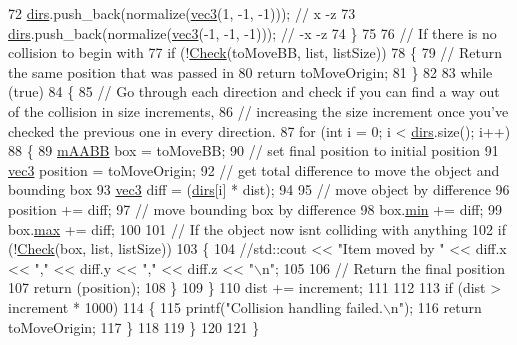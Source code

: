 \begin{DoxyCode}
72         \hyperlink{_island_collision_8cpp_aaaaa7b4cf9092c0cbadd963f4a7bc551}{dirs}.push\_back(normalize(\hyperlink{_types_8h_a3d0ce73e3199de81565fb01632415288}{vec3}(1, -1, -1))); \textcolor{comment}{// x -z}
73         \hyperlink{_island_collision_8cpp_aaaaa7b4cf9092c0cbadd963f4a7bc551}{dirs}.push\_back(normalize(\hyperlink{_types_8h_a3d0ce73e3199de81565fb01632415288}{vec3}(-1, -1, -1))); \textcolor{comment}{// -x -z}
74     \}
75 
76     \textcolor{comment}{// If there is no collision to begin with}
77     \textcolor{keywordflow}{if} (!\hyperlink{class_island_collision_a78e4fc740b5676ec2470fb3bd06e7fb7}{Check}(toMoveBB, list, listSize))
78     \{
79         \textcolor{comment}{// Return the same position that was passed in}
80         \textcolor{keywordflow}{return} toMoveOrigin;
81     \}
82 
83     \textcolor{keywordflow}{while} (\textcolor{keyword}{true})
84     \{
85         \textcolor{comment}{// Go through each direction and check if you can find a way out of the collision in size
       increments, }
86         \textcolor{comment}{// increasing the size increment once you've checked the previous one in every direction.}
87         \textcolor{keywordflow}{for} (\textcolor{keywordtype}{int} i = 0; i < \hyperlink{_island_collision_8cpp_aaaaa7b4cf9092c0cbadd963f4a7bc551}{dirs}.size(); i++)
88         \{
89             \hyperlink{structm_a_a_b_b}{mAABB} box = toMoveBB;
90             \textcolor{comment}{// set final position to initial position}
91             \hyperlink{_types_8h_a3d0ce73e3199de81565fb01632415288}{vec3} position = toMoveOrigin;
92             \textcolor{comment}{// get total difference to move the object and bounding box}
93             \hyperlink{_types_8h_a3d0ce73e3199de81565fb01632415288}{vec3} diff = (\hyperlink{_island_collision_8cpp_aaaaa7b4cf9092c0cbadd963f4a7bc551}{dirs}[i] * dist); 
94 
95             \textcolor{comment}{// move object by difference                                      }
96             position += diff;
97             \textcolor{comment}{// move bounding box by difference}
98             box.\hyperlink{structm_a_a_b_b_af759d65b18f76e266945883107dcafc8}{min} += diff; 
99             box.\hyperlink{structm_a_a_b_b_a9866d0a5a3ceb5dbff2bf87372f3094a}{max} += diff;
100 
101             \textcolor{comment}{// If the object now isnt colliding with anything}
102             \textcolor{keywordflow}{if} (!\hyperlink{class_island_collision_a78e4fc740b5676ec2470fb3bd06e7fb7}{Check}(box, list, listSize))
103             \{
104                 \textcolor{comment}{//std::cout << "Item moved by " << diff.x << "," << diff.y << "," << diff.z << "\(\backslash\)n";}
105 
106                 \textcolor{comment}{// Return the final position}
107                 \textcolor{keywordflow}{return} (position);
108             \}
109         \}
110         dist += increment;
111 
112 
113         \textcolor{keywordflow}{if} (dist > increment * 1000)
114         \{
115             printf(\textcolor{stringliteral}{"Collision handling failed.\(\backslash\)n"});
116             \textcolor{keywordflow}{return} toMoveOrigin;
117         \}
118 
119     \}
120     
121 \}\end{DoxyCode}


